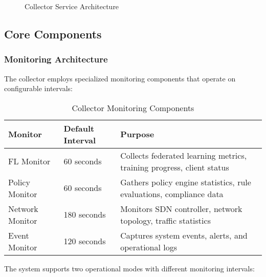 \begin{figure}[H]
\caption{Collector Service Architecture}
\label{fig:collector-architecture}
\end{figure}

\subsection{Core Components}

\subsubsection{Monitoring Architecture}

The collector employs specialized monitoring components that operate on configurable intervals:

\begin{table}[H]
\centering
\caption{Collector Monitoring Components}
\label{tab:collector-monitors}
\begin{tabular}{@{}llp{6cm}@{}}
\toprule
\textbf{Monitor} & \textbf{Default Interval} & \textbf{Purpose} \\
\midrule
FL Monitor & 60 seconds & Collects federated learning metrics, training progress, client status \\
Policy Monitor & 60 seconds & Gathers policy engine statistics, rule evaluations, compliance data \\
Network Monitor & 180 seconds & Monitors SDN controller, network topology, traffic statistics \\
Event Monitor & 120 seconds & Captures system events, alerts, and operational logs \\
\bottomrule
\end{tabular}
\end{table}

The system supports two operational modes with different monitoring intervals:


